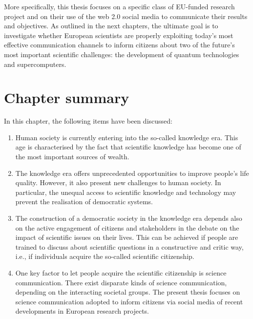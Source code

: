 More specifically, this thesis focuses on a specific class of EU-funded research project and on their use of the web 2.0 social media to communicate their results and objectives. As outlined in the next chapters, the ultimate goal is to investigate whether European scientists are properly exploiting today's most effective communication channels to inform citizens about two of the future's most important scientific challenges: the development of quantum technologies and supercomputers.

\section{Chapter summary} 
In this chapter, the following items have been discussed:

\begin{enumerate}
 \item Human society is currently entering into the so-called knowledge era. This age is characterised by the fact that scientific knowledge has become one of the most important sources of wealth. 
 \item The knowledge era offers unprecedented opportunities to improve people's life quality. However, it also present new challenges to human society. In particular, the unequal access to scientific knowledge and technology may prevent the realisation of democratic systems.
 \item The construction of a democratic society in the knowledge era depends also on the active engagement of citizens and stakeholders in the debate on the impact of scientific issues on their lives. This can be achieved if people are trained to discuss about scientific questions in a constructive and critic way, i.e., if individuals acquire the so-called scientific citizenship.
 \item One key factor to let people acquire the scientific citizenship is science communication. There exist disparate kinds of science communication, depending on the interacting societal groups. The present thesis focuses on science communication adopted to inform citizens via social media of recent developments in European research projects.     
\end{enumerate}